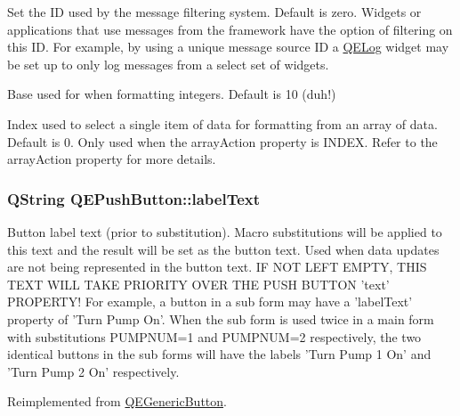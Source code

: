 \label{classQEPushButton_af2101a8ce89f2fa34261cc8b6d2d4715}
Set the ID used by the message filtering system. Default is zero. Widgets or applications that use messages from the framework have the option of filtering on this ID. For example, by using a unique message source ID a \hyperlink{classQELog}{QELog} widget may be set up to only log messages from a select set of widgets.

Base used for when formatting integers. Default is 10 (duh!)

Index used to select a single item of data for formatting from an array of data. Default is 0. Only used when the arrayAction property is INDEX. Refer to the arrayAction property for more details. \hypertarget{classQEPushButton_ac6a77971fd82a22ded755ac39533877e}{
\subsubsection[{labelText}]{\setlength{\rightskip}{0pt plus 5cm}QString QEPushButton::labelText}}
\label{classQEPushButton_ac6a77971fd82a22ded755ac39533877e}
Button label text (prior to substitution). Macro substitutions will be applied to this text and the result will be set as the button text. Used when data updates are not being represented in the button text. IF NOT LEFT EMPTY, THIS TEXT WILL TAKE PRIORITY OVER THE PUSH BUTTON 'text' PROPERTY! For example, a button in a sub form may have a 'labelText' property of 'Turn Pump  On'. When the sub form is used twice in a main form with substitutions PUMPNUM=1 and PUMPNUM=2 respectively, the two identical buttons in the sub forms will have the labels 'Turn Pump 1 On' and 'Turn Pump 2 On' respectively. 

Reimplemented from \hyperlink{classQEGenericButton}{QEGenericButton}.

